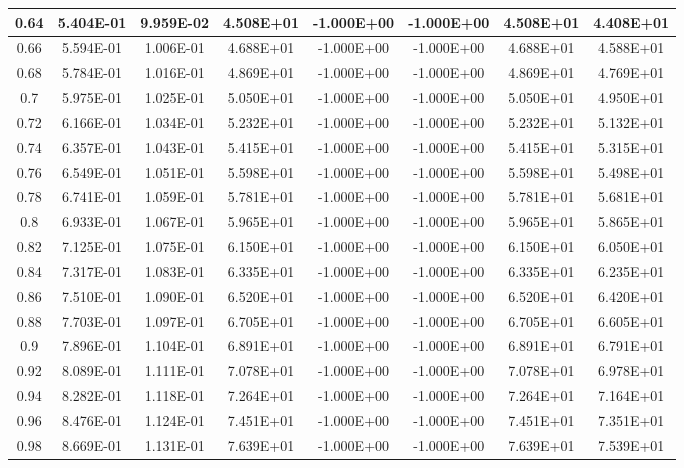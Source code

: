 \documentclass{article}
\begin{document}
\begin{center}
\begin{longtable}{|c|c|c|c|c|c|c|c|}
        0.64 & 5.404E-01 & 9.959E-02 & 4.508E+01 & -1.000E+00 & -1.000E+00 & 4.508E+01 & 4.408E+01 \\ \hline
        0.66 & 5.594E-01 & 1.006E-01 & 4.688E+01 & -1.000E+00 & -1.000E+00 & 4.688E+01 & 4.588E+01 \\ \hline
        0.68 & 5.784E-01 & 1.016E-01 & 4.869E+01 & -1.000E+00 & -1.000E+00 & 4.869E+01 & 4.769E+01 \\ \hline
        0.7 & 5.975E-01 & 1.025E-01 & 5.050E+01 & -1.000E+00 & -1.000E+00 & 5.050E+01 & 4.950E+01 \\ \hline
        0.72 & 6.166E-01 & 1.034E-01 & 5.232E+01 & -1.000E+00 & -1.000E+00 & 5.232E+01 & 5.132E+01 \\ \hline
        0.74 & 6.357E-01 & 1.043E-01 & 5.415E+01 & -1.000E+00 & -1.000E+00 & 5.415E+01 & 5.315E+01 \\ \hline
        0.76 & 6.549E-01 & 1.051E-01 & 5.598E+01 & -1.000E+00 & -1.000E+00 & 5.598E+01 & 5.498E+01 \\ \hline
        0.78 & 6.741E-01 & 1.059E-01 & 5.781E+01 & -1.000E+00 & -1.000E+00 & 5.781E+01 & 5.681E+01 \\ \hline
        0.8 & 6.933E-01 & 1.067E-01 & 5.965E+01 & -1.000E+00 & -1.000E+00 & 5.965E+01 & 5.865E+01 \\ \hline
        0.82 & 7.125E-01 & 1.075E-01 & 6.150E+01 & -1.000E+00 & -1.000E+00 & 6.150E+01 & 6.050E+01 \\ \hline
        0.84 & 7.317E-01 & 1.083E-01 & 6.335E+01 & -1.000E+00 & -1.000E+00 & 6.335E+01 & 6.235E+01 \\ \hline
        0.86 & 7.510E-01 & 1.090E-01 & 6.520E+01 & -1.000E+00 & -1.000E+00 & 6.520E+01 & 6.420E+01 \\ \hline
        0.88 & 7.703E-01 & 1.097E-01 & 6.705E+01 & -1.000E+00 & -1.000E+00 & 6.705E+01 & 6.605E+01 \\ \hline
        0.9 & 7.896E-01 & 1.104E-01 & 6.891E+01 & -1.000E+00 & -1.000E+00 & 6.891E+01 & 6.791E+01 \\ \hline
        0.92 & 8.089E-01 & 1.111E-01 & 7.078E+01 & -1.000E+00 & -1.000E+00 & 7.078E+01 & 6.978E+01 \\ \hline
        0.94 & 8.282E-01 & 1.118E-01 & 7.264E+01 & -1.000E+00 & -1.000E+00 & 7.264E+01 & 7.164E+01 \\ \hline
        0.96 & 8.476E-01 & 1.124E-01 & 7.451E+01 & -1.000E+00 & -1.000E+00 & 7.451E+01 & 7.351E+01 \\ \hline
        0.98 & 8.669E-01 & 1.131E-01 & 7.639E+01 & -1.000E+00 & -1.000E+00 & 7.639E+01 & 7.539E+01 \\ \hline

\end{longtable}
\end{center}
\end{document}
